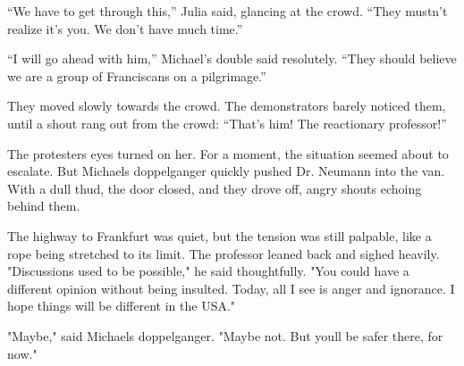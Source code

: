 \documentclass[
]{article}
\begin{document}
``We have to get through this,'' Julia said, glancing at the crowd. ``They mustn't realize it's you. We don't have much time.''

``I will go ahead with him,'' Michael's double said resolutely. ``They should believe we are a group of Franciscans on a pilgrimage.''

They moved slowly towards the crowd. The demonstrators barely noticed them, until a shout rang out from the crowd: ``That's him! The reactionary professor!''

The protesters\textquotesingle{} eyes turned on her. For a moment, the situation seemed about to escalate. But Michael\textquotesingle s doppelganger quickly pushed Dr. Neumann into the van. With a dull thud, the door closed, and they drove off, angry shouts echoing behind them.

The highway to Frankfurt was quiet, but the tension was still palpable, like a rope being stretched to its limit. The professor leaned back and sighed heavily. "Discussions used to be possible," he said thoughtfully. "You could have a different opinion without being insulted. Today, all I see is anger and ignorance. I hope things will be different in the USA."

"Maybe," said Michael\textquotesingle s doppelganger. "Maybe not. But you\textquotesingle ll be safer there, for now."
\end{document}
